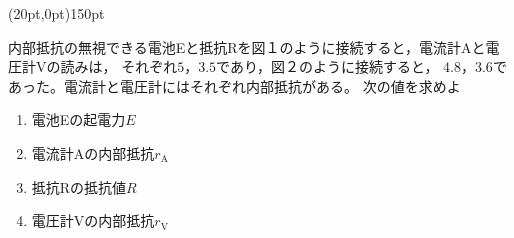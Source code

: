 \hakosyokika
\item
    \begin{mawarikomi}(20pt,0pt){150pt}{
        
        
    }
        内部抵抗の無視できる電池Eと抵抗Rを図１のように接続すると，電流計Aと電圧計Vの読みは，
        それぞれ$5$，$3.5$であり，図２のように接続すると，
        $4.8$，$3.6$であった。電流計と電圧計にはそれぞれ内部抵抗がある。
        次の値を求めよ
        \begin{enumerate}
            \item 電池Eの起電力$E$
            \item 電流計Aの内部抵抗$r_\mathrm{A}$
            \item 抵抗Rの抵抗値$R$
            \item 電圧計Vの内部抵抗$r_\mathrm{V}$
        \end{enumerate}
    \end{mawarikomi}